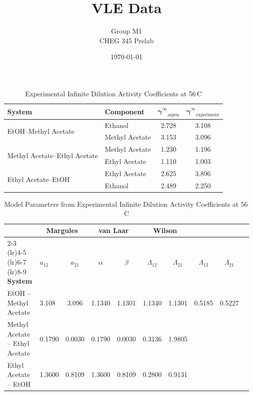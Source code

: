\documentclass[10pt]{beamer}
\title{VLE Data}
\author{Group M1 \\ CHEG 345 Prelab}
\date{\today}
\begin{document}
\begin{frame}
    \titlepage
\end{frame}

\begin{frame}
    \begin{table}[h]
    \centering
    \caption{Experimental Infinite Dilution Activity Coefficients at 56\,\textdegree C}
    \label{tab:activity_coefficients}
    \begin{tabular}{llcc}
    \toprule
    \textbf{System} & \textbf{Component} & $\boldsymbol{\gamma^\infty}_\text{aspen}$ & $\boldsymbol{\gamma^\infty}_\text{experiment}$ \\
    \midrule
    \multirow{2}{*}{EtOH--Methyl Acetate}   & Ethanol          & 2.728 & 3.108 \\
                                            & Methyl Acetate & 3.153 & 3.096 \\
    \midrule
    \multirow{2}{*}{Methyl Acetate--Ethyl Acetate} & Methyl Acetate & 1.230 & 1.196 \\
                                                & Ethyl Acetate  & 1.110 & 1.003 \\
    \midrule
    \multirow{2}{*}{Ethyl Acetate--EtOH}    & Ethyl Acetate  & 2.625 & 3.896 \\
                                            & Ethanol           & 2.489 & 2.250 \\
    \bottomrule
    \end{tabular}
    \end{table}
\end{frame}

\begin{frame}
    \begin{table}[h]
    \centering
    \caption{Model Parameters from Experimental Infinite Dilution Activity Coefficients at 56\,\textdegree C}
    \begin{tabular}{llcccccccc}
    \toprule
    & \multicolumn{2}{c}{\textbf{Margules}} & \multicolumn{2}{c}{\textbf{van Laar}} & \multicolumn{2}{c}{\textbf{Wilson}} \\
    \cmidrule(lr){2-3} \cmidrule(lr){4-5} \cmidrule(lr){6-7} \cmidrule(lr){8-9}
    \textbf{System} & \textbf{$a_{12}$} & \textbf{$a_{21}$} & \textbf{$\alpha$} & \textbf{$\beta$} & \textbf{$\Lambda_{12}$} & \textbf{$\Lambda_{21}$} & \textbf{$\Lambda_{12}$} & \textbf{$\Lambda_{21}$} \\
    \midrule
    EtOH -- Methyl Acetate         & 3.108 & 3.096 & 1.1340 & 1.1301 & 1.1340 & 1.1301 & 0.5185 & 0.5227 \\
    Methyl Acetate -- Ethyl Acetate  & 0.1790 & 0.0030 & 0.1790 & 0.0030 & 0.3136 & 1.9805 \\
    Ethyl Acetate -- EtOH        & 1.3600 & 0.8109 & 1.3600 & 0.8109 & 0.2800 & 0.9131 \\
    \bottomrule
    \end{tabular}
    \label{tab:model_parameters}
    \end{table}
\end{frame}
\end{document}
